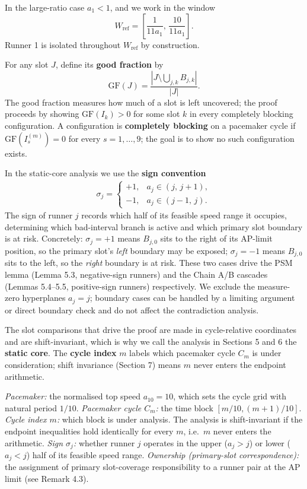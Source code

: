 \documentclass[12pt]{article}
\begin{document}
In the large-ratio case $a_1<1$, and we work in the window
\[
W_{\mathrm{ref}} = \left[\frac{1}{11a_1},\,\frac{10}{11a_1}\right].
\]
Runner 1 is isolated throughout $W_{\mathrm{ref}}$ by construction.

For any slot $J$, define its \textbf{good fraction} by
\[
\mathrm{GF}(J) = \frac{|J\setminus\bigcup_{j,k}B_{j,k}|}{|J|}.
\]
The good fraction measures how much of a slot is left uncovered; the proof proceeds by
showing $\mathrm{GF}(I_k)>0$ for some slot $k$ in every completely blocking configuration.
A configuration is \textbf{completely blocking} on a pacemaker cycle if $\mathrm{GF}(I_s^{(m)})=0$
for every $s=1,\ldots,9$; the goal is to show no such configuration exists.

In the static-core analysis we use the \textbf{sign convention}
\begin{align*}
\sigma_j =
  \begin{cases}
    +1, & a_j\in(j,\,j+1),\\
    -1, & a_j\in(j-1,\,j).
  \end{cases}
\end{align*}
The sign of runner $j$ records which half of its feasible speed range it occupies,
determining which bad-interval branch is active and which primary slot boundary is at
risk. Concretely: $\sigma_j=+1$ means $B_{j,0}$ sits to the right of its AP-limit
position, so the primary slot's \emph{left} boundary may be exposed; $\sigma_j=-1$ means
$B_{j,0}$ sits to the left, so the \emph{right} boundary is at risk. These two cases drive
the PSM lemma (Lemma 5.3, negative-sign runners) and the Chain A/B cascades
(Lemmas 5.4--5.5, positive-sign runners) respectively.
We exclude the measure-zero hyperplanes $a_j=j$; boundary cases can be handled by a
limiting argument or direct boundary check and do not affect the contradiction analysis.

The slot comparisons that drive the proof are made in cycle-relative coordinates and are
shift-invariant, which is why we call the analysis in Sections 5 and 6 the \textbf{static core}. The \textbf{cycle index} $m$ labels which pacemaker cycle $C_m$ is under consideration;
shift invariance (Section 7) means $m$ never enters the endpoint arithmetic.

\begin{remark}\label{rem:21}
\emph{Pacemaker:} the normalised top speed $a_{10}=10$, which sets the cycle grid with
natural period $1/10$.
\emph{Pacemaker cycle $C_m$:} the time block $[m/10,(m+1)/10]$.
\emph{Cycle index $m$:} which block is under analysis. The analysis is shift-invariant if
the endpoint inequalities hold identically for every $m$, i.e.\ $m$ never enters
the arithmetic.
\emph{Sign $\sigma_j$:} whether runner $j$ operates in the upper ($a_j>j$) or lower
($a_j<j$) half of its feasible speed range.
\emph{Ownership (primary-slot correspondence):} the assignment of primary slot-coverage
responsibility to a runner pair at the AP limit (see Remark 4.3).

\end{remark}
\end{document}
